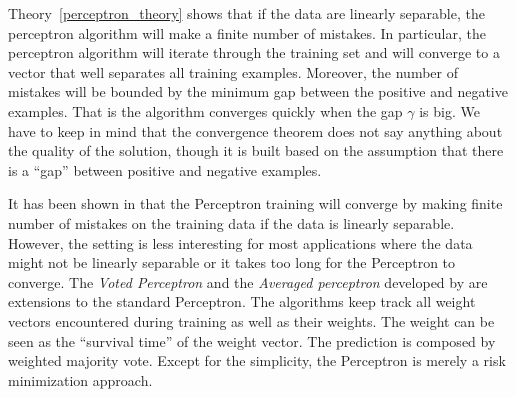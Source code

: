 {Theory~\ref{perceptron_theory} shows that if the data are linearly separable, the perceptron algorithm will make a finite number of mistakes. 
In particular, the perceptron algorithm will iterate through the training set and will converge to a vector that well separates all training examples.
Moreover, the number of mistakes will be bounded by the minimum gap between the positive and negative examples.
That is the algorithm converges quickly when the gap $\gamma$ is big.
We have to keep in mind that the convergence theorem does not say anything about the quality of the solution, though it is built based on the assumption that there is a ``gap'' between positive and negative examples.
\fi

It has been shown in \citep{Block62the,Novikoff62} that the Perceptron training will converge by making finite number of mistakes on the training data if the data is linearly separable.
However, the setting is less interesting for most applications where the data might not be linearly separable or it takes too long for the Perceptron to converge.
The \textit{Voted Perceptron} and the \textit{Averaged perceptron} developed by \citet{Freund99large} are extensions to the standard Perceptron.
The algorithms keep track all weight vectors encountered during training as well as their weights.
The weight can be seen as the ``survival time'' of the weight vector.
The prediction is composed by weighted majority vote.
Except for the simplicity, the Perceptron is merely a risk minimization approach.

}
